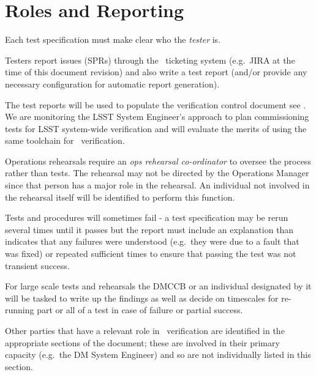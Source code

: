 

\section{Roles and Reporting}

Each test specification must make clear who the {\em tester} is. 

Testers report issues (SPRs) through the \product\ ticketing system (e.g.\ JIRA at the time of this document revision) and also write a test report (and/or provide any necessary configuration for automatic report generation). 

The test reports will be used to populate the verification control document see . We are monitoring the LSST System Engineer's approach to plan commissioning tests for LSST system-wide verification and will evaluate the merits of using the same toolchain for \product\ verification.

Operations rehearsals require an {\em ops rehearsal co-ordinator} to oversee the process rather than tests. The rehearsal may not be directed by the Operations Manager since that person has a major role in the rehearsal. An individual not involved in the rehearsal itself will be identified to perform this function. 

Tests and procedures will sometimes fail - a test specification may be rerun several times until it passes but the report must include an explanation than indicates that any failures were understood (e.g.\ they were due to a fault that was fixed) or repeated sufficient times to ensure that passing the test was not transient success.

For large scale tests and rehearsals the DMCCB or an individual designated by it will be tasked to write up the findings as well as decide on timescales for re-running part or all of a test in case of failure or partial success.

Other parties that have a relevant role in \product\ verification are identified in the appropriate sections of the document; these are involved in their primary capacity (e.g.\ the DM System Engineer) and so are not individually listed in this section.
